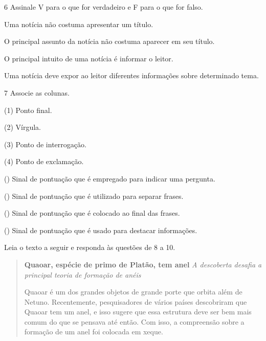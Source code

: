 \num{6} Assinale V para o que for verdadeiro e F para o que for falso.

\begin{boxlist}
 Uma notícia não costuma apresentar um título.

 O principal assunto da notícia não costuma aparecer em seu título.

 O principal intuito de uma notícia é informar o leitor.

 Uma notícia deve expor ao leitor diferentes informações sobre
determinado tema.
\end{boxlist}

\num{7} Associe as colunas.

\begin{multicols}{2}
(1) Ponto final.\medskip

(2) Vírgula.\medskip

(3) Ponto de interrogação.\medskip

(4) Ponto de exclamação.

\columnbreak

() Sinal de pontuação que é empregado para indicar uma pergunta.

() Sinal de pontuação que é utilizado para separar frases.

() Sinal de pontuação que é colocado ao final das frases.

() Sinal de pontuação que é usado para destacar informações.
\end{multicols}

Leia o texto a seguir e responda às questões de 8 a 10.

\begin{quote}
\textbf{Quaoar, espécie de primo de Platão, tem anel}
\textit{A descoberta desafia a principal teoria de formação de anéis}

Quaoar é um dos grandes objetos de grande porte que orbita além de Netuno.
Recentemente, pesquisadores de vários países descobriram que Quaoar tem um
anel, e isso sugere que essa estrutura deve ser bem mais comum do que se
pensava até então. Com isso, a compreensão sobre a formação de um anel
foi colocada em xeque.

\end{quote}

